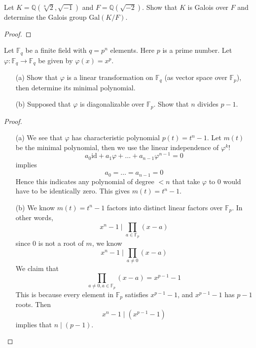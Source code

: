 \documentclass[openany]{book}
\newcommand{\F}{\mathbb{F}}
\newcommand{\id}{\text{id}}
\begin{document}
\begin{prob}
    Let \(K = \mathbb{Q}(\sqrt[8]{2}, \sqrt{-1})\) and \(F = \mathbb{Q}(\sqrt{-2})\). Show that \(K\) is Galois over \(F\) and determine the Galois group \(\text{Gal}(K/F)\).
\end{prob}
\begin{proof}
    
\end{proof}





\begin{prob}
    Let \(\mathbb{F}_q\) be a finite field with \(q = p^n\) elements. Here \(p\) is a prime number. Let \(\varphi : \mathbb{F}_q \rightarrow \mathbb{F}_q\) be given by \(\varphi(x) = x^p\).
    \begin{itemize}
        \item[(a)] Show that \(\varphi\) is a linear transformation on \(\mathbb{F}_q\) (as vector space over \(\mathbb{F}_p\)), then determine its minimal polynomial.
        \item[(b)] Supposed that \(\varphi\) is diagonalizable over \(\mathbb{F}_p\). Show that \(n\) divides \(p - 1\).
    \end{itemize}
\end{prob}
\begin{proof}
    \begin{enumerate}
        \item[(a)] We see that $\varphi$ has characteristic polynomial $p(t)=t^n-1$. Let $m(t)$ be the minimal polynomial, then we use the linear independence of $\varphi^k$!
        \begin{equation*}
            a_0\id+a_1\varphi+\dots+a_{n-1}\varphi^{n-1}=0
        \end{equation*}
        implies 
        \begin{equation*}
            a_0=\dots=a_{n-1}=0
        \end{equation*}
        Hence this indicates any polynomial of degree $<n$ that take $\varphi$ to $0$ would have to be identically zero. This gives $m(t)=t^n-1$.
        \item[(b)] We know $m(t)=t^n-1$ factors into distinct linear factors over $\F_p$. In other words, 
        \begin{equation*}
            x^n-1\mid\prod_{a\in\F_p}(x-a)
        \end{equation*}
        since $0$ is not a root of $m$, we know 
        \begin{equation*}
            x^n-1\mid\prod_{a\neq 0}(x-a)
        \end{equation*}
        We claim that 
        \begin{equation*}
            \prod_{a\neq 0, a\in\F_p}(x-a)=x^{p-1}-1
        \end{equation*}
        This is because every element in $\F_p$ satisfies $x^{p-1}-1$, and $x^{p-1}-1$ has $p-1$ roots. Then 
        \begin{equation*}
            x^n-1\mid(x^{p-1}-1)
        \end{equation*}
        implies that $n\mid(p-1)$.
    \end{enumerate}
\end{proof}
\end{document}
